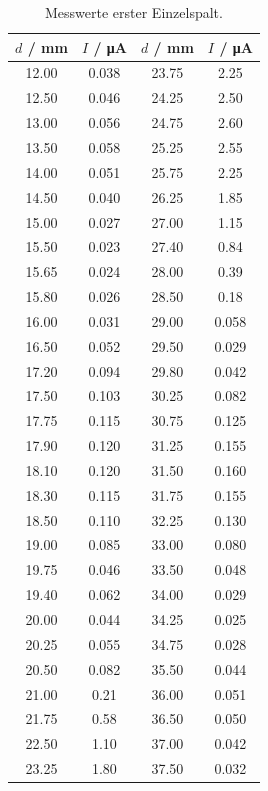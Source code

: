 \begin{table}
  \centering
  \caption{Messwerte erster Einzelspalt.}
  \label{tab:1}
  \begin{tabular}{c c || c c }
    \toprule
    $d$ / \si{\milli\meter} & $I$ / \si{\micro\ampere} & $d$ / \si{\milli\meter} & $I$ / \si{\micro\ampere} \\
    \midrule
    12.00 & 0.038 & 23.75 & 2.25 \\
    12.50 & 0.046 & 24.25 & 2.50 \\
    13.00 & 0.056 & 24.75 & 2.60 \\
    13.50 & 0.058 & 25.25 & 2.55 \\
    14.00 & 0.051 & 25.75 & 2.25 \\
    14.50 & 0.040 & 26.25 & 1.85 \\
    15.00 & 0.027 & 27.00 & 1.15 \\
    15.50 & 0.023 & 27.40 & 0.84 \\
    15.65 & 0.024 & 28.00 & 0.39 \\
    15.80 & 0.026 & 28.50 & 0.18 \\
    16.00 & 0.031 & 29.00 & 0.058 \\
    16.50 & 0.052 & 29.50 & 0.029 \\
    17.20 & 0.094 & 29.80 & 0.042 \\
    17.50 & 0.103 & 30.25 & 0.082 \\
    17.75 & 0.115 & 30.75 & 0.125 \\
    17.90 & 0.120 & 31.25 & 0.155 \\
    18.10 & 0.120 & 31.50 & 0.160 \\
    18.30 & 0.115 & 31.75 & 0.155 \\
    18.50 & 0.110 & 32.25 & 0.130 \\
    19.00 & 0.085 & 33.00 & 0.080 \\
    19.75 & 0.046 & 33.50 & 0.048 \\
    19.40 & 0.062 & 34.00 & 0.029 \\
    20.00 & 0.044 & 34.25 & 0.025 \\
    20.25 & 0.055 & 34.75 & 0.028 \\
    20.50 & 0.082 & 35.50 & 0.044 \\
    21.00 & 0.21 & 36.00 & 0.051 \\
    21.75 & 0.58 & 36.50 & 0.050 \\
    22.50 & 1.10 & 37.00 & 0.042 \\
    23.25 & 1.80 & 37.50 & 0.032 \\
    \bottomrule
    \end{tabular}
\end{table}
\newpage

